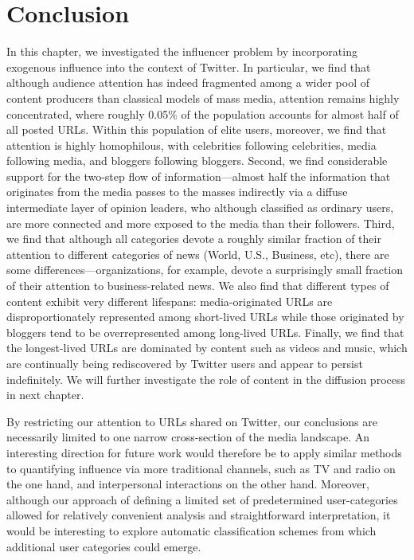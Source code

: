 \documentclass[phd,tocprelim]{cornell}
\begin{document}
\section{Conclusion}
\label{sec:conclusion}
In this chapter, we investigated the influencer problem by incorporating exogenous influence into the context of Twitter.  
In particular, we find that although audience attention has indeed fragmented among
a wider pool of content producers than classical models of mass media,
attention remains highly concentrated, where roughly 0.05\% of the population
accounts for almost half of all posted URLs.  Within this
population of elite users, moreover, we find that attention is highly homophilous, with
celebrities following celebrities, media following media, and bloggers
following bloggers.  Second, we find considerable support for the two-step
flow of information---almost half the information that originates from the
media passes to the masses indirectly via a diffuse intermediate layer of
opinion leaders, who although classified as ordinary users, are more
connected and more exposed to the media than their followers.  Third, we
find that although all categories devote a roughly similar fraction of
their attention to different categories of news (World, U.S., Business,
etc), there are some differences---organizations, for example, devote a
surprisingly small fraction of their attention to business-related news.
We also find that different types of content exhibit very different
lifespans: media-originated URLs are disproportionately represented among
short-lived URLs while those originated by bloggers tend to be
overrepresented among long-lived URLs. Finally, we find that the
longest-lived URLs are dominated by content such as videos and music, which
are continually being rediscovered by Twitter users and appear to persist
indefinitely. We will further investigate the role of content in the diffusion process in next chapter.

By restricting our attention to URLs shared on Twitter, our conclusions are
necessarily limited to one narrow cross-section of the media landscape.  An
interesting direction for future work would therefore be to apply similar
methods to quantifying influence via more traditional channels, such
as TV and radio on the one hand, and interpersonal interactions on the
other hand.  Moreover, although our approach of defining a limited set of
predetermined user-categories allowed for relatively convenient analysis
and straightforward interpretation, it would be interesting to explore
automatic classification schemes from which additional user categories
could emerge.
\end{document}
